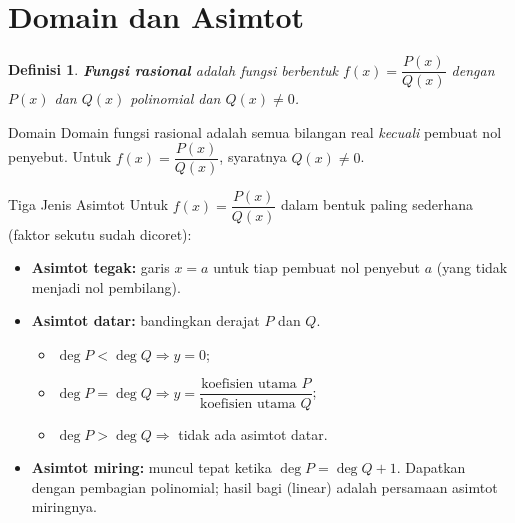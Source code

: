 \documentclass[11pt,a4paper]{report}
\theoremstyle{gaya}
\newtheorem{definisi}{Definisi}[chapter]
\begin{document}
\section{Domain dan Asimtot}
\begin{definisi}
\textbf{Fungsi rasional} adalah fungsi berbentuk $f(x)=\dfrac{P(x)}{Q(x)}$ dengan $P(x)$ dan $Q(x)$ polinomial dan $Q(x)\neq 0$.
\end{definisi}

\begin{konsep}{Domain}
Domain fungsi rasional adalah semua bilangan real \emph{kecuali} pembuat nol penyebut. Untuk $f(x)=\dfrac{P(x)}{Q(x)}$, syaratnya $Q(x)\neq 0$.
\end{konsep}

\begin{konsep}{Tiga Jenis Asimtot}
Untuk $f(x)=\dfrac{P(x)}{Q(x)}$ dalam bentuk paling sederhana (faktor sekutu sudah dicoret):
\begin{itemize}[leftmargin=*,topsep=2pt]
  \item \textbf{Asimtot tegak:} garis $x=a$ untuk tiap pembuat nol penyebut $a$ (yang tidak menjadi nol pembilang).
  \item \textbf{Asimtot datar:} bandingkan derajat $P$ dan $Q$.
  \begin{itemize}
    \item $\deg P<\deg Q \Rightarrow y=0$;
    \item $\deg P=\deg Q \Rightarrow y=\dfrac{\text{koefisien utama }P}{\text{koefisien utama }Q}$;
    \item $\deg P>\deg Q \Rightarrow$ tidak ada asimtot datar.
  \end{itemize}
  \item \textbf{Asimtot miring:} muncul tepat ketika $\deg P=\deg Q+1$. Dapatkan dengan pembagian polinomial; hasil bagi (linear) adalah persamaan asimtot miringnya.
\end{itemize}
\end{konsep}
\end{document}
